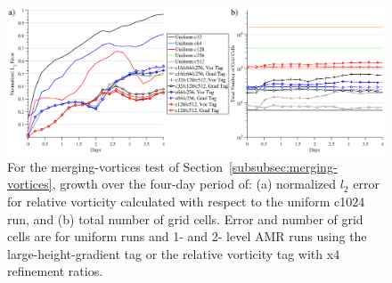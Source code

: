 %
\begin{figure}
    \centerline{%
    \noindent
    \includegraphics[width=\textwidth]{Chap1/final_symvor_merge_l2err_grid.eps}}
    \caption{
    For the merging-vortices test of
Section~\ref{subsubsec:merging-vortices},
growth over the four-day period of:
(a) normalized $l_2$ error for relative vorticity calculated with respect to the uniform c1024 run, and
 (b) total number of grid cells.
Error and number of grid cells are for uniform runs and 1- and 2-
    level AMR runs using the large-height-gradient tag or the
    relative vorticity tag with x4 refinement ratios.}%
    \label{fig:symvor_merge_l2err}
\end{figure}
%
\begin{table}
    \caption{Run times (wall-clock time in s and as \% of the
    c512 time) for 4-day merging-vortices simulations
(Section~\ref{subsubsec:merging-vortices})
with uniform and AMR runs
    using only eight processors on one node of NCAR's Yellowstone computing platform. The total number of cells is counted at day 4.}%
    \label{tb:mergvor_time}
\end{table}

